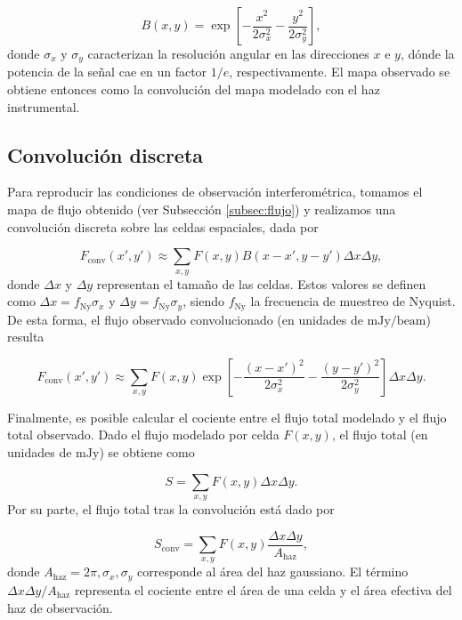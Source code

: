 \begin{equation}\label{eq:mod-45}
B(x,y) = \exp{\left[-\frac{x^2}{2\sigma_x^2} - \frac{y^2}{2\sigma_y^2}\right]},
\end{equation}
donde $\sigma_x$ y $\sigma_y$ caracterizan la resolución angular en las direcciones $x$ e $y$, dónde la potencia de la señal cae en un factor $1/e$, respectivamente.
	El mapa observado se obtiene entonces como la convolución del mapa modelado con el haz instrumental.

\subsection{Convolución discreta}

	Para reproducir las condiciones de observación interferométrica, tomamos el mapa de flujo obtenido (ver Subsección \ref{subsec:flujo}) y realizamos una convolución discreta sobre las celdas espaciales, dada por

\begin{equation}\label{eq:mod-46}
F_\mathrm{conv}(x',y') \approx \sum_{x,y} F(x,y) B(x-x',y-y')\Delta x \Delta y,
\end{equation}
donde $\Delta x$ y $\Delta y$ representan el tamaño de las celdas.
	Estos valores se definen como $\Delta x= f_\mathrm{Ny} \sigma_{x}$ y $\Delta y = f_\mathrm{Ny} \sigma_{y}$, siendo $f_\mathrm{Ny}$ la frecuencia de muestreo de Nyquist.
	De esta forma, el flujo observado convolucionado (en unidades de $\mathrm{mJy/beam}$) resulta

\begin{equation}\label{eq:mod-47}
F_\mathrm{conv}(x',y') \approx \sum_{x,y} F(x,y)
\exp \left[-\frac{(x-x')^2}{2\sigma_x^2} - \frac{(y-y')^2}{2\sigma_y^2}\right] \Delta x\Delta y.
\end{equation}

	Finalmente, es posible calcular el cociente entre el flujo total modelado y el flujo total observado.
	Dado el flujo modelado por celda $F(x,y)$, el flujo total (en unidades de $\mathrm{mJy}$) se obtiene como

\begin{equation}\label{eq:mod-48}
S = \sum_{x,y} F(x,y)\Delta x \Delta y.
\end{equation}
	Por su parte, el flujo total tras la convolución está dado por

\begin{equation}\label{eq:mod-49}
S_\mathrm{conv} = \sum_{x,y} F(x,y) \frac{\Delta x \Delta y}{A_\mathrm{haz}},
\end{equation}
donde $A_\mathrm{haz} = 2\pi, \sigma_x, \sigma_y$ corresponde al área del haz gaussiano.
	El término ${\Delta x \Delta y}/{A_\mathrm{haz}}$ representa el cociente entre el área de una celda y el área efectiva del haz de observación.

